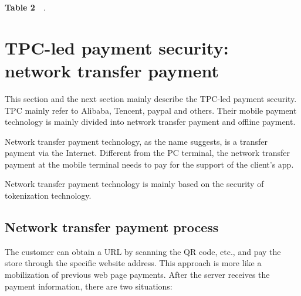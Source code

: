 \documentclass[journal]{IEEEtran}
\begin{document}
\begin{center}
\textbf{Table 2}~~.\\
\end{center}



\section{TPC-led payment security: network transfer payment}
This section and the next section mainly describe the TPC-led payment security. TPC mainly refer to Alibaba, Tencent, paypal and others. Their mobile payment technology is mainly divided into network transfer payment and offline payment.


Network transfer payment technology, as the name suggests, is a transfer payment via the Internet. Different from the PC terminal, the network transfer payment at the mobile terminal needs to pay for the support of the client's app.

Network transfer payment technology is mainly based on the security of tokenization technology.

\subsection{Network transfer payment process}
The customer can obtain a URL by scanning the QR code, etc., and pay the store through the specific website address. This approach is more like a mobilization of previous web page payments. After the server receives the payment information, there are two situations:
\end{document}
